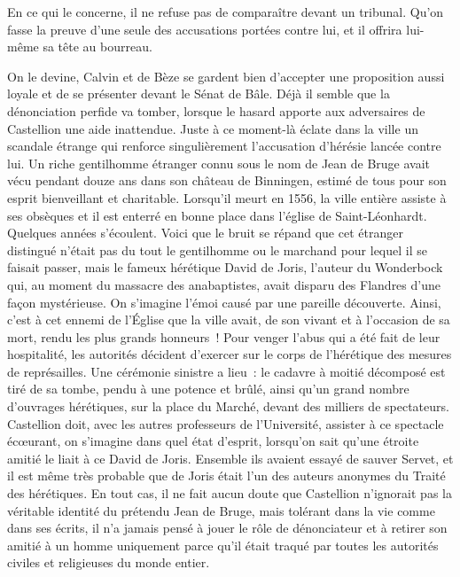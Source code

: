 \documentclass[french,twoside]{book} %
\begin{document}
\noindent En ce qui le concerne, il ne refuse pas de comparaître devant un tribunal. Qu’on fasse la preuve d’une seule des accusations portées contre lui, et il offrira lui-même sa tête au bourreau.\par
On le devine, Calvin et de Bèze se gardent bien d’accepter une proposition aussi loyale et de se présenter devant le Sénat de Bâle. Déjà il semble que la dénonciation perfide va tomber, lorsque le hasard apporte aux adversaires de Castellion une aide inattendue. Juste à ce moment-là éclate dans la ville un scandale étrange qui renforce singulièrement l’accusation d’hérésie lancée contre lui. Un riche gentilhomme étranger connu sous le nom de Jean de Bruge avait vécu pendant douze ans dans son château de Binningen, estimé de tous pour son esprit bienveillant et charitable. Lorsqu’il meurt en 1556, la ville entière assiste à ses obsèques et il est enterré en bonne place dans l’église de Saint-Léonhardt. Quelques années s’écoulent. Voici que le bruit se répand que cet étranger distingué n’était pas du tout le gentilhomme ou le marchand pour lequel il se faisait passer, mais le fameux hérétique David de Joris, l’auteur du Wonderbock qui, au moment du massacre des anabaptistes, avait disparu des Flandres d’une façon mystérieuse. On s’imagine l’émoi causé par une pareille découverte. Ainsi, c’est à cet ennemi de l’Église que la ville avait, de son vivant et à l’occasion de sa mort, rendu les plus grands honneurs ! Pour venger l’abus qui a été fait de leur hospitalité, les autorités décident d’exercer sur le corps de l’hérétique des mesures de représailles. Une cérémonie sinistre a lieu : le cadavre à moitié décomposé est tiré de sa tombe, pendu à une potence et brûlé, ainsi qu’un grand nombre d’ouvrages hérétiques, sur la place du Marché, devant des milliers de spectateurs. Castellion doit, avec les autres professeurs de l’Université, assister à ce spectacle écœurant, on s’imagine dans quel état d’esprit, lorsqu’on sait qu’une étroite amitié le liait à ce David de Joris. Ensemble ils avaient essayé de sauver Servet, et il est même très probable que de Joris était l’un des auteurs anonymes du Traité des hérétiques. En tout cas, il ne fait aucun doute que Castellion n’ignorait pas la véritable identité du prétendu Jean de Bruge, mais tolérant dans la vie comme dans ses écrits, il n’a jamais pensé à jouer le rôle de dénonciateur et à retirer son amitié à un homme uniquement parce qu’il était traqué par toutes les autorités civiles et religieuses du monde entier.\par
\end{document}
